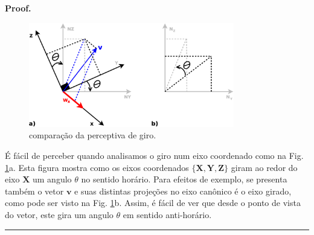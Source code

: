 \documentclass[a4paper,10pt]{report}
\newenvironment{proof}[1][Proof]{\textbf{#1.} }{\ \rule{0.5em}{0.5em}}
\begin{document}
\begin{proof}
\begin{figure}[h!]
\centering
  \includegraphics[width=0.8\textwidth]{images/giroparcial.eps} 
\caption{ comparação da perceptiva de giro.}
\label{fig:giroparcial}
\end{figure}
 É fácil de perceber quando analisamos o giro num eixo coordenado
 como na Fig. \ref{fig:giroparcial}a.
 Esta figura mostra como os eixos coordenados
 $\{\mathbf{X},\mathbf{Y},\mathbf{Z}\}$ giram ao redor do eixo 
 $\mathbf{X}$ um angulo $\theta$ no sentido horário.
 Para efeitos de exemplo, se presenta também o vetor $\mathbf{v}$
 e suas distintas projeções no eixo canônico é o eixo girado,
 como pode ser visto na Fig. \ref{fig:giroparcial}b.
 Assim, é fácil de ver que desde o ponto de vista do vetor,
 este gira um angulo $\theta$ em sentido anti-horário.
\end{proof}
\end{document}
